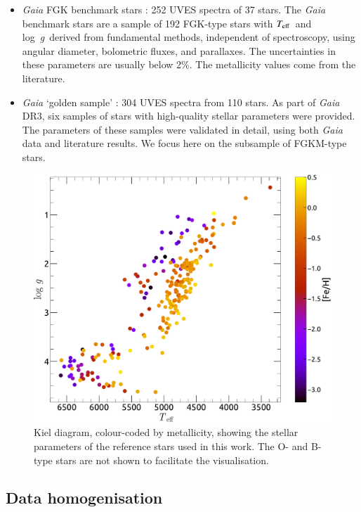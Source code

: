 \documentclass{aa}
\def\teff{$\textit{T}_{\rm{eff}}$}
\def\logg{\mbox{log~{\it g}}}
\begin{document}
\begin{itemize}
    \item \textit{Gaia} FGK benchmark stars \citep{2024A&A...682A.145S}: 252 UVES spectra of 37 stars. The \textit{Gaia} benchmark stars are a sample of 192 FGK-type stars with \teff\ and \logg\ derived from fundamental methods, independent of spectroscopy, using angular diameter, bolometric fluxes, and parallaxes. The uncertainties in these parameters are usually below 2$\%$. The metallicity values come from the literature. 
    
    \item \textit{Gaia} `golden sample' \citep{2023A&A...674A..39G}: 304 UVES spectra from 110 stars.
    As part of \textit{Gaia} DR3, six samples of stars with high-quality stellar parameters were provided. The parameters of these samples were validated in detail, using both \textit{Gaia} data and literature results. We focus here on the subsample of FGKM-type stars.
    
\end{itemize}

\begin{figure}[t]
  \centering
  \includegraphics[width=0.9\linewidth]{Plots/kielbench.pdf}
  \caption{Kiel diagram, colour-coded by metallicity, showing the stellar parameters of the reference stars used in this work. The O- and B-type stars are not shown to facilitate the visualisation.}
  \label{fig:kieldiag_bench}
\end{figure}


\subsection{Data homogenisation}
\label{subsec:homogenization}
\end{document}
